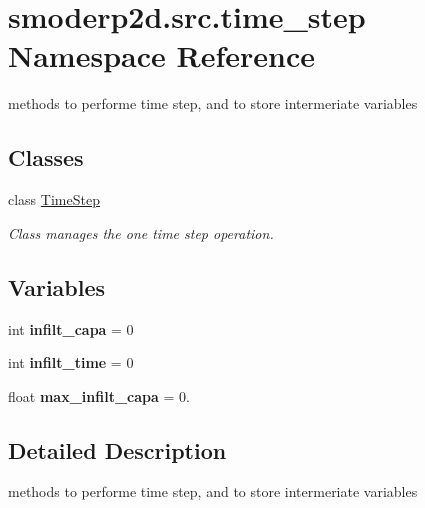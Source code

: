 \hypertarget{namespacesmoderp2d_1_1src_1_1time__step}{\section{smoderp2d.\-src.\-time\-\_\-step Namespace Reference}
\label{namespacesmoderp2d_1_1src_1_1time__step}
}


methods to performe time step, and to store intermeriate variables  


\subsection*{Classes}
\begin{DoxyCompactItemize}
\item 
class \hyperlink{classsmoderp2d_1_1src_1_1time__step_1_1TimeStep}{Time\-Step}
\begin{DoxyCompactList}\small\item\em Class manages the one time step operation. \end{DoxyCompactList}\end{DoxyCompactItemize}
\subsection*{Variables}
\begin{DoxyCompactItemize}
\item 
\hypertarget{namespacesmoderp2d_1_1src_1_1time__step_aa5fcb206bfcee04e54d4a882fc8b2302}{int {\bfseries infilt\-\_\-capa} = 0}\label{namespacesmoderp2d_1_1src_1_1time__step_aa5fcb206bfcee04e54d4a882fc8b2302}

\item 
\hypertarget{namespacesmoderp2d_1_1src_1_1time__step_a03f925986a308ac01e7570deaed674ac}{int {\bfseries infilt\-\_\-time} = 0}\label{namespacesmoderp2d_1_1src_1_1time__step_a03f925986a308ac01e7570deaed674ac}

\item 
\hypertarget{namespacesmoderp2d_1_1src_1_1time__step_a946f3dc3497f57711c2d45002cc2bc51}{float {\bfseries max\-\_\-infilt\-\_\-capa} = 0.}\label{namespacesmoderp2d_1_1src_1_1time__step_a946f3dc3497f57711c2d45002cc2bc51}

\end{DoxyCompactItemize}


\subsection{Detailed Description}
methods to performe time step, and to store intermeriate variables 